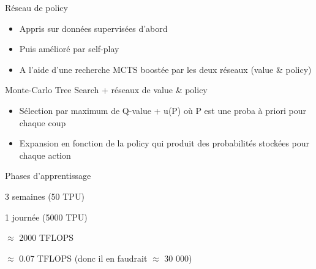 \begin{frame}{Réseau de policy}
  \begin{minipage}[c]{0.50\linewidth}
  \end{minipage}\hfill
  \begin{minipage}[c]{0.49\linewidth}
    \begin{itemize}[<+->]
      \item Appris sur données supervisées d'abord
      \item Puis amélioré par self-play
      \item A l'aide d'une recherche MCTS boostée par les deux réseaux (value \& policy)
    \end{itemize}
  \end{minipage}\hfill
\end{frame}

\begin{frame}{Monte-Carlo Tree Search + réseaux de value \& policy}
  \begin{itemize}[<+->]
    \item Sélection par maximum de Q-value + u(P) où P est une proba à priori pour chaque coup
    \item Expansion en fonction de la policy qui produit des probabilités stockées pour chaque action
  \end{itemize}
\end{frame}

\begin{frame}{Phases d'apprentissage}
  \begin{description}[<+->]
    \item[Supervisé] 3 semaines (50 TPU) 
    \item[Renforcement] 1 journée (5000 TPU)
  \end{description}


  \begin{description}[<+->]
    \item[50 TPU] $\approx$ 2000 TFLOPS
    \item[Core i7] $\approx$ 0.07 TFLOPS (donc il en faudrait $\approx$ 30 000)
  \end{description}
\end{frame}

